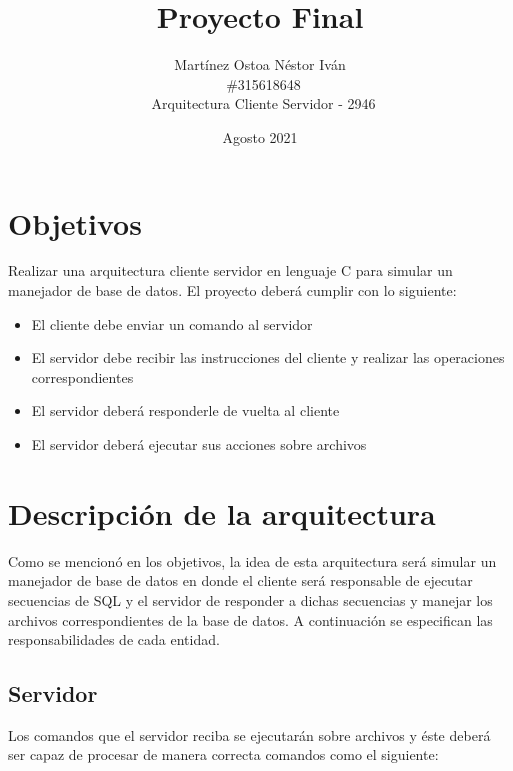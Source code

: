\documentclass{article}
\title{ \textbf{Proyecto Final} }
\author{Martínez Ostoa Néstor Iván \\ \#315618648 \\ Arquitectura Cliente Servidor - 2946}
\date{Agosto 2021}
\begin{document}
\maketitle


\section{Objetivos}

Realizar una arquitectura cliente servidor en lenguaje C para simular un manejador de base de datos. El proyecto deberá cumplir con lo siguiente: 

\begin{itemize}
    \item El cliente debe enviar un comando al servidor
    \item El servidor debe recibir las instrucciones del cliente y realizar las operaciones correspondientes
    \item El servidor deberá responderle de vuelta al cliente
	\item El servidor deberá ejecutar sus acciones sobre archivos
\end{itemize}


\section{Descripción de la arquitectura}

Como se mencionó en los objetivos, la idea de esta arquitectura será simular un manejador de base de datos en donde el cliente será responsable de ejecutar secuencias de SQL y el servidor de responder a dichas secuencias y manejar los archivos correspondientes de la base de datos. A continuación se especifican las responsabilidades de cada entidad. 

\subsection{Servidor}

Los comandos que el servidor reciba se ejecutarán sobre archivos y éste deberá ser capaz de procesar de manera correcta comandos como el siguiente: \\
\end{document}
